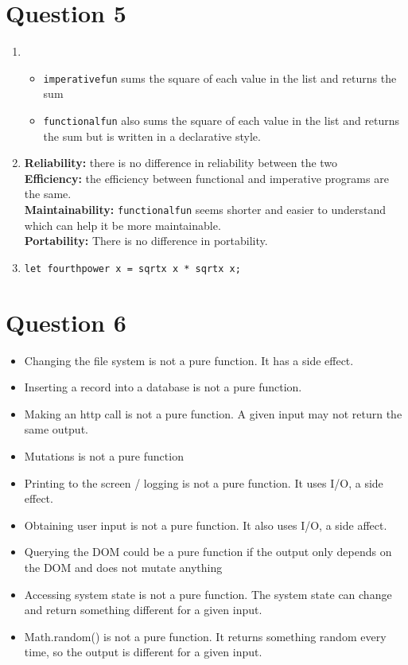 \documentclass[8pt, letterpaper, titlepage]{article}
\begin{document}
\section*{Question 5}
\begin{enumerate}[label=\alph*.]
  \item \begin{itemize}
    \item \lstinline{imperativefun} sums the square of each value in the list and returns the sum
    \item \lstinline{functionalfun} also sums the square of each value in the list and returns the sum but is written in a declarative style.
  \end{itemize}
  \item \textbf{Reliability:} there is no difference in reliability between the two \\
 \textbf{Efficiency:} the efficiency between functional and imperative programs are the same. \\
  \textbf{Maintainability:} \lstinline{functionalfun} seems shorter and easier to understand which can help it be more maintainable. \\
\textbf{Portability:} There is no difference in portability.
\item \lstinline{let fourthpower x = sqrtx x * sqrtx x;}
\end{enumerate}

\section*{Question 6}
\begin{itemize}
  \item Changing the file system is not a pure function. It has a side effect.
  \item Inserting a record into a database is not a pure function.
  \item Making an http call is not a pure function. A given input may not return the same output.
  \item Mutations is not a pure function
  \item Printing to the screen / logging is not a pure function. It uses I/O, a side effect.
  \item Obtaining user input is not a pure function. It also uses I/O, a side affect.
  \item Querying the DOM could be a pure function if the output only depends on the DOM and does not mutate anything
  \item Accessing system state is not a pure function. The system state can change and return something different for a given input.
  \item Math.random() is not a pure function. It returns something random every time, so the output is different for a given input.
\end{itemize}
\end{document}
